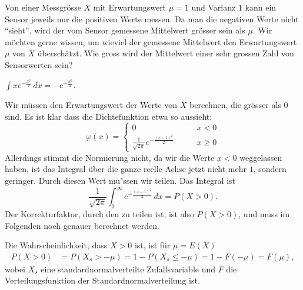 Von einer Messgrösse $X$ mit Erwartungswert $\mu=1$ und Varianz $1$
kann ein Sensor jeweils nur die positiven Werte messen.
Da man die negativen Werte nicht ``sieht'', wird der vom Sensor gemessene
Mittelwert grösser sein als $\mu$.
Wir möchten gerne wissen, um wieviel der gemessene Mittelwert den Erwartungswert
$\mu$ von $X$ überschätzt.
Wie gross wird der Mittelwert einer sehr grossen Zahl von Sensorwerten sein?

\begin{hinweis}
$\int xe^{-\frac{x^2}2}\,dx = -e^{-\frac{x^2}2}.$
\end{hinweis}

\begin{loesung}
Wir müssen den Erwartungswert der Werte von $X$ berechnen, die grösser
als $0$ sind. Es ist klar dass die Dichtefunktion etwa so aussieht:
\[
\varphi(x)=\begin{cases}
0&\qquad x<0\\
\frac1{\sqrt{2\pi}}e^{-\frac{(x-1)^2}2}&\qquad x\ge 0
\end{cases}
\]
Allerdings stimmt die Normierung nicht, da wir die Werte $x < 0$ weggelassen
haben, ist das Integral über die ganze reelle Achse jetzt nicht mehr $1$,
sondern geringer. Durch diesen Wert mu"ssen wir teilen. Das Integral ist
\[
\frac1{\sqrt{2\pi}}
\int_{0}^\infty
e^{-\frac{(x-1)^2}2}\,dx=
P(X > 0).
\]
Der Korrekturfaktor, durch den zu teilen ist, ist also $P(X>0)$, und muss im
Folgenden noch genauer berechnet werden.

Die Wahrscheinlichkeit, dass $X>0$ ist, ist für $\mu=E(X)$
\begin{align*}
P(X>0)&=P(X_s > -\mu)=1-P(X_s\le-\mu)=1-F(-\mu)=F(\mu),
\end{align*}
wobei $X_s$ eine standardnormalverteilte Zufallsvariable und $F$ die
Verteilungsfunktion der Standardnormalverteilung ist.


\end{loesung}
